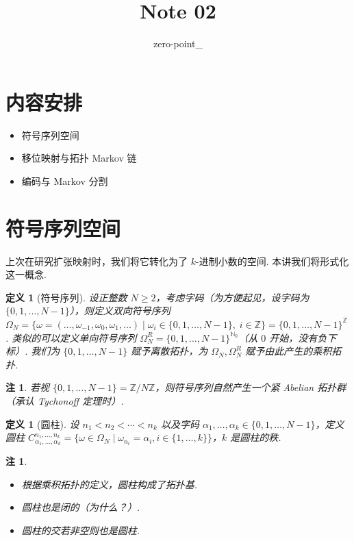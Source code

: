 \documentclass[11pt, a4paper, oneside]{ctexart}
\title{Note 02}
\author{zero-point\_}
\newtheorem{definition}[theorem]{定义}
\newtheorem{remark}[theorem]{注}
\newcommand{\N}{\mathbb{N}}
\newcommand{\Z}{\mathbb{Z}}
\begin{document}
	\maketitle
    \section{内容安排}
    \begin{itemize}
        \item 符号序列空间
        \item 移位映射与拓扑 Markov 链
        \item 编码与 Markov 分割
    \end{itemize}

    \section{符号序列空间}
    上次在研究扩张映射时，我们将它转化为了 $k$-进制小数的空间. 本讲我们将形式化这一概念.
    \begin{definition}[符号序列]
        设正整数 $N\geq 2$，考虑字码（为方便起见，设字码为 $\{0,1,\ldots,N-1\}$），则定义双向符号序列 $\Omega_N=\{\omega=(\ldots,\omega_{-1},\omega_0,\omega_1,\ldots)\mid \omega_i\in\{0,1,\ldots,N-1\},\; i\in\Z\}={\{0,1,\ldots,N-1\}}^{\Z}$. 类似的可以定义单向符号序列 $\Omega_N^R={\{0,1,\ldots,N-1\}}^{\N_0}$（从 $0$ 开始，没有负下标）. 我们为 $\{0,1,\ldots,N-1\}$ 赋予离散拓扑，为 $\Omega_N,\Omega_N^R$ 赋予由此产生的乘积拓扑.
    \end{definition}
    \begin{remark}
        若视 $\{0,1,\ldots,N-1\}=\Z/N\Z$，则符号序列自然产生一个紧 Abelian 拓扑群（承认 Tychonoff 定理时）.
    \end{remark}
    \begin{definition}[圆柱]
        设 $n_1<n_2<\cdots<n_k$ 以及字码 $\alpha_1,\ldots,\alpha_k\in\{0,1,\ldots,N-1\}$，定义圆柱 $C_{\alpha_1,\ldots,\alpha_k}^{n_1,\ldots,n_k}=\{\omega\in\Omega_N\mid \omega_{n_i}=\alpha_i,i\in\{1,\ldots,k\}\}$，$k$ 是圆柱的秩.
    \end{definition}
    \begin{remark}
        \begin{itemize}
            \item 根据乘积拓扑的定义，圆柱构成了拓扑基.
            \item 圆柱也是闭的（为什么？）.
            \item 圆柱的交若非空则也是圆柱.
        \end{itemize}
    \end{remark}
\end{document}
